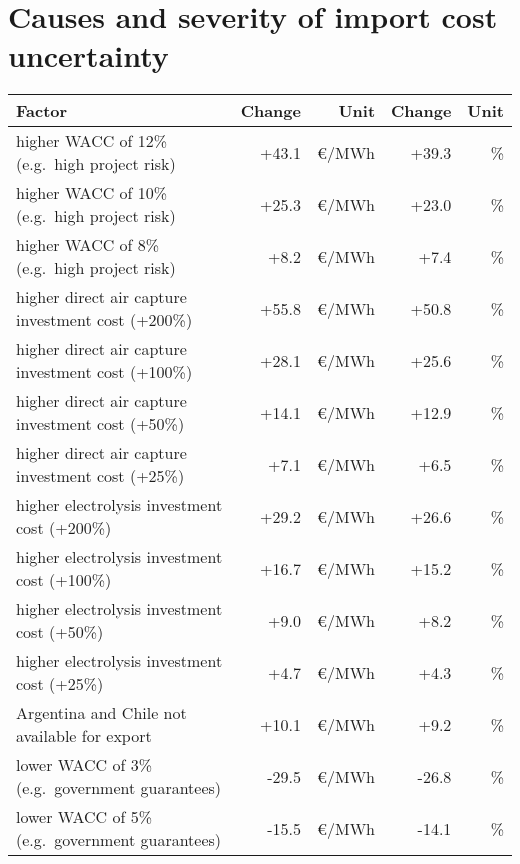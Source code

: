 \documentclass[5p,10pt]{elsarticle}
\begin{document}
\appendix

\onecolumn


\section{Causes and severity of import cost uncertainty}


\begin{table*}[!htb]
    \small
    \centering
    \begin{tabular}{lrrrr}
        \toprule
        Factor & Change & Unit & Change & Unit\\
        \midrule
        higher WACC of 12\% (e.g.~high project risk) & +43.1 & \euro{}/MWh  &
        +39.3 & \% \\
        higher WACC of 10\% (e.g.~high project risk) & +25.3 & \euro{}/MWh  &
        +23.0 & \% \\
        higher WACC of 8\% (e.g.~high project risk) & +8.2 & \euro{}/MWh  & +7.4
        & \% \\
        higher direct air capture investment cost (+200\%) & +55.8 & \euro{}/MWh
        & +50.8 & \% \\
        higher direct air capture investment cost (+100\%) & +28.1 & \euro{}/MWh
        & +25.6 & \% \\
        higher direct air capture investment cost (+50\%) & +14.1 & \euro{}/MWh
        & +12.9 & \% \\
        higher direct air capture investment cost (+25\%) & +7.1 & \euro{}/MWh &
        +6.5 & \% \\
        higher electrolysis investment cost (+200\%) & +29.2 & \euro{}/MWh  &
        +26.6 & \% \\
        higher electrolysis investment cost (+100\%) & +16.7 & \euro{}/MWh  &
        +15.2 & \% \\
        higher electrolysis investment cost (+50\%) & +9.0 & \euro{}/MWh  & +8.2
        & \% \\
        higher electrolysis investment cost (+25\%) & +4.7 & \euro{}/MWh  & +4.3
        & \% \\
        Argentina and Chile not available for export & +10.1 & \euro{}/MWh  &
        +9.2 & \% \\
        \midrule
        lower WACC of 3\% (e.g.~government guarantees) & -29.5 & \euro{}/MWh  &
        -26.8 & \% \\
        lower WACC of 5\% (e.g.~government guarantees) & -15.5 & \euro{}/MWh  &
        -14.1 & \% \\

\end{tabular}
\end{table*}
\end{document}

